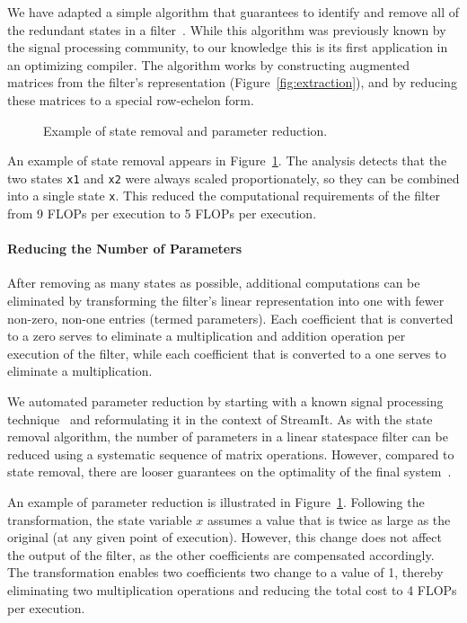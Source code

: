 We have adapted a simple algorithm that guarantees to identify and
remove all of the redundant states in a filter~\cite{Mayne}.  While
this algorithm was previously known by the signal processing
community, to our knowledge this is its first application in an
optimizing compiler.  The algorithm works by constructing augmented
matrices from the filter's representation
(Figure~\ref{fig:extraction}), and by reducing these matrices to a
special row-echelon form.

\begin{figure}[t]
\caption{Example of state removal and parameter reduction.\protect\label{fig:states}}
\end{figure}

An example of state removal appears in Figure~\ref{fig:states}.  The
analysis detects that the two states {\tt x1} and {\tt x2} were always
scaled proportionately, so they can be combined into a single state
{\tt x}.  This reduced the computational requirements of the filter
from 9 FLOPs per execution to 5 FLOPs per execution.

\paragraph*{Reducing the Number of Parameters}  After removing as 
many states as possible, additional computations can be eliminated by
transforming the filter's linear representation into one with fewer
non-zero, non-one entries (termed parameters).  Each coefficient that
is converted to a zero serves to eliminate a multiplication and
addition operation per execution of the filter, while each coefficient
that is converted to a one serves to eliminate a multiplication.  

We automated parameter reduction by starting with a known signal
processing technique~\cite{Ackermann/Bucy} and reformulating it in the
context of StreamIt.  As with the state removal algorithm, the number
of parameters in a linear statespace filter can be reduced using a
systematic sequence of matrix operations.  However, compared to state
removal, there are looser guarantees on the optimality of the final
system~\cite{agrawal:cases:2005}.

An example of parameter reduction is illustrated in
Figure~\ref{fig:states}.  Following the transformation, the state
variable $x$ assumes a value that is twice as large as the original
(at any given point of execution).  However, this change does not
affect the output of the filter, as the other coefficients are
compensated accordingly.  The transformation enables two coefficients
two change to a value of 1, thereby eliminating two multiplication
operations and reducing the total cost to 4 FLOPs per execution.

